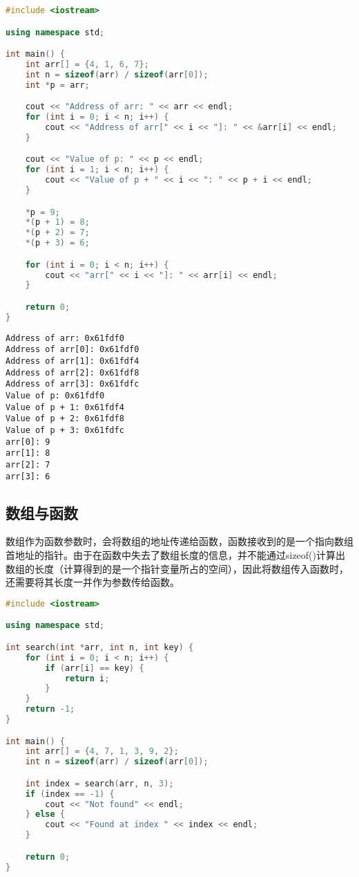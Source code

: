
\begin{lstlisting}[language=C++]
#include <iostream>

using namespace std;

int main() {
    int arr[] = {4, 1, 6, 7};
    int n = sizeof(arr) / sizeof(arr[0]);
    int *p = arr;

    cout << "Address of arr: " << arr << endl;
    for (int i = 0; i < n; i++) {
        cout << "Address of arr[" << i << "]: " << &arr[i] << endl;
    }

    cout << "Value of p: " << p << endl;
    for (int i = 1; i < n; i++) {
        cout << "Value of p + " << i << ": " << p + i << endl;
    }

    *p = 9;
    *(p + 1) = 8;
    *(p + 2) = 7;
    *(p + 3) = 6;

    for (int i = 0; i < n; i++) {
        cout << "arr[" << i << "]: " << arr[i] << endl;
    }

    return 0;
}
\end{lstlisting}

\begin{tcolorbox}
    \begin{verbatim}
Address of arr: 0x61fdf0   
Address of arr[0]: 0x61fdf0
Address of arr[1]: 0x61fdf4
Address of arr[2]: 0x61fdf8
Address of arr[3]: 0x61fdfc
Value of p: 0x61fdf0
Value of p + 1: 0x61fdf4
Value of p + 2: 0x61fdf8
Value of p + 3: 0x61fdfc
arr[0]: 9
arr[1]: 8
arr[2]: 7
arr[3]: 6
	\end{verbatim}
\end{tcolorbox}

\vspace{0.5cm}

\subsection{数组与函数}

数组作为函数参数时，会将数组的地址传递给函数，函数接收到的是一个指向数组首地址的指针。由于在函数中失去了数组长度的信息，并不能通过sizeof()计算出数组的长度（计算得到的是一个指针变量所占的空间），因此将数组传入函数时，还需要将其长度一并作为参数传给函数。\\


\begin{lstlisting}[language=C++]
#include <iostream>

using namespace std;

int search(int *arr, int n, int key) {
    for (int i = 0; i < n; i++) {
        if (arr[i] == key) {
            return i;
        }
    }
    return -1;
}

int main() {
    int arr[] = {4, 7, 1, 3, 9, 2};
    int n = sizeof(arr) / sizeof(arr[0]);

    int index = search(arr, n, 3);
    if (index == -1) {
        cout << "Not found" << endl;
    } else {
        cout << "Found at index " << index << endl;
    }

    return 0;
}
\end{lstlisting}

